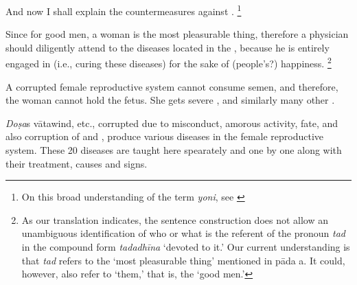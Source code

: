 \begin{translation}

\item [1] And now I shall explain the countermeasures against .%
	\footnote{%
	On this broad understanding of the term \emph{yoni}, see \cite[pp.\ 
	572--5]{das-orig}}

\item [2] Since for good men, a woman is the most pleasurable thing, therefore a physician should diligently attend to the diseases located in the , because he is entirely engaged in (i.e., curing these diseases) for the sake of (people's?) happiness.%
	\footnote{%
	As our translation indicates, the sentence construction does not allow an 
	unambiguous identification of who or what is the referent of the pronoun 
	\textit{tad} in the compound form \emph{tadadhīna} ‘devoted to it.’ Our 
	current understanding is that \emph{tad} refers to the ‘most pleasurable thing’ 
	mentioned in pāda a. It could, however, also refer to ‘them,’ that is, the ‘good 
	men.’%
	}

\item [3] A corrupted female reproductive system cannot consume semen, and 
therefore, the woman cannot hold the fetus. She gets severe 
, 
 and similarly many other 
.

\item [4] \emph{Doṣa}s \si{vāta}{wind}, etc., corrupted due to misconduct, amorous activity, fate, and also corruption of  and , produce various diseases in the female reproductive system. These 20 diseases are taught here spearately and one by one along with their treatment, causes and signs.


\end{translation}
